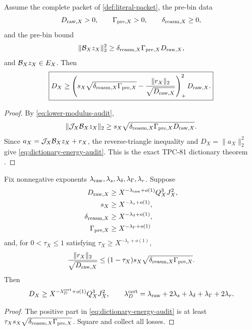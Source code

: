 \begin{theorem}
\label{thm:dictionary-energy-audit}
Assume the complete packet of \cref{def:literal-packet}, the pre-bin
data
\[
 D_{{\rm raw},X}>0,\qquad
 \Gamma_{{\rm pre},X}>0,\qquad
 \delta_{{\rm reasm},X}\ge0,
\]
and the pre-bin bound
\[
 \|\mathcal B_Xz_X\|_2^2
 \ge
 \delta_{{\rm reasm},X}\Gamma_{{\rm pre},X}
 D_{{\rm raw},X},
\]
and \(\mathcal B_Xz_X\in E_X\).  Then
\begin{equation}
\boxed{
 D_X\ge
 \left(
 s_X\sqrt{\delta_{{\rm reasm},X}\Gamma_{{\rm pre},X}}
 -
 \frac{\|r_X\|_2}{\sqrt{D_{{\rm raw},X}}}
 \right)_+^2D_{{\rm raw},X}.}
\label{eq:dictionary-energy-audit}
\end{equation}
\end{theorem}

\begin{proof}
By \eqref{eq:lower-modulus-audit},
\[
 \|\mathcal J_X\mathcal B_Xz_X\|_2
 \ge
 s_X\sqrt{\delta_{{\rm reasm},X}\Gamma_{{\rm pre},X}
 D_{{\rm raw},X}}.
\]
Since \(a_X=\mathcal J_X\mathcal B_Xz_X+r_X\), the reverse-triangle inequality and
\(D_X=\|a_X\|_2^2\) give
\eqref{eq:dictionary-energy-audit}.  This is the exact TPC-81
dictionary theorem \citep{WangTPC81}.
\end{proof}

\begin{corollary}
\label{cor:visible-energy-ledger}
Fix nonnegative exponents
\(\lambda_{\rm raw},\lambda_s,\lambda_\delta,\lambda_\Gamma,
\lambda_r\).  Suppose
\begin{align*}
 D_{{\rm raw},X}
 &\ge X^{-\lambda_{\rm raw}+o(1)}Q_X^3J_X^2,\\
 s_X&\ge X^{-\lambda_s+o(1)},\\
 \delta_{{\rm reasm},X}
 &\ge X^{-\lambda_\delta+o(1)},\\
 \Gamma_{{\rm pre},X}
 &\ge X^{-\lambda_\Gamma+o(1)}
\end{align*}
and, for \(0<\tau_X\le1\) satisfying
\(\tau_X\ge X^{-\lambda_r+o(1)}\),
\[
 \frac{\|r_X\|_2}{\sqrt{D_{{\rm raw},X}}}
 \le
 (1-\tau_X)s_X
 \sqrt{\delta_{{\rm reasm},X}\Gamma_{{\rm pre},X}}.
\]
Then
\begin{equation}
 D_X\ge X^{-\lambda_D^{\rm cert}+o(1)}Q_X^3J_X^2,
\qquad
 \lambda_D^{\rm cert}=
 \lambda_{\rm raw}+2\lambda_s+\lambda_\delta
 +\lambda_\Gamma+2\lambda_r.
\label{eq:lambdaD-audit}
\end{equation}
\end{corollary}

\begin{proof}
The positive part in \eqref{eq:dictionary-energy-audit} is at least
\(\tau_Xs_X
\sqrt{\delta_{{\rm reasm},X}\Gamma_{{\rm pre},X}}\).
Square and collect all losses.
\end{proof}

